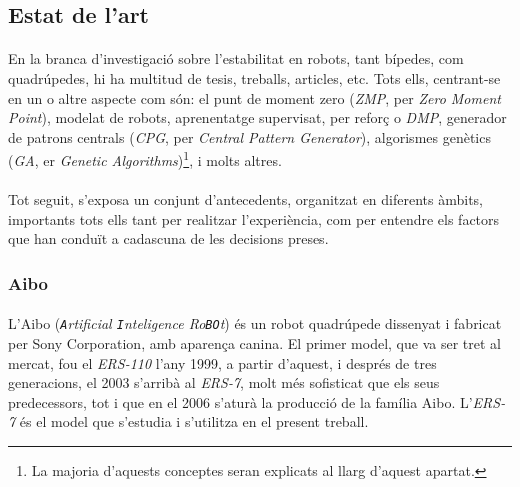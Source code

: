 \documentclass[12pt,a4paper,final,twoside]{article}
\begin{document}
\label{Estat-de-l'art}
\subsection{Estat de l'art}




\paragraph{}En la branca d'investigació sobre l'estabilitat en robots, tant bípedes, com quadrúpedes, hi ha multitud de tesis, treballs, articles, etc. Tots ells, centrant-se en un o altre aspecte com són: el punt de moment zero (\textit{ZMP}, per \textit{Zero Moment Point}), modelat de robots, aprenentatge supervisat, per reforç o \textit{DMP}, generador de patrons centrals (\textit{CPG}, per \textit{Central Pattern Generator}), algorismes genètics (\textit{GA}, er \textit{Genetic Algorithms})\footnote{La majoria d'aquests conceptes seran explicats al llarg d'aquest apartat.}, i molts altres.

\paragraph{}Tot seguit, s'exposa un conjunt d'antecedents, organitzat en diferents àmbits, importants tots ells tant per realitzar l'experiència, com per entendre els factors que han conduït a cadascuna de les decisions preses.

\label{AIBO}
\subsubsection{Aibo}

\paragraph{}L'Aibo (\textit{\texttt{A}rtificial \texttt{I}nteligence Ro\texttt{BO}t}) és un robot quadrúpede dissenyat i fabricat per Sony Corporation, amb aparença canina. El primer model, que va ser tret al mercat, fou el \textit{ERS-110} l'any 1999, a partir d'aquest, i després de tres generacions, el 2003 s'arribà al \textit{ERS-7}, molt més sofisticat que els seus predecessors, tot i que en el 2006 s'aturà la producció de la família Aibo. L'\textit{ERS-7} és el model que s'estudia i s'utilitza en el present treball.
\end{document}
